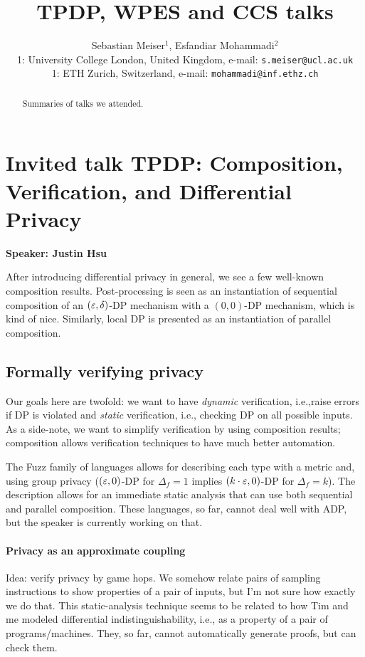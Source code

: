 \documentclass{article}
\title{TPDP, WPES and CCS talks}
\author{Sebastian Meiser$^1$, Esfandiar Mohammadi$^2$\\%
 1: University College London, United Kingdom, e-mail: \texttt{s.meiser@ucl.ac.uk}\\%
 1: ETH Zurich, Switzerland, e-mail: \texttt{mohammadi@inf.ethz.ch}\\%
}
\begin{document}
\maketitle

\begin{abstract}
Summaries of talks we attended.
\end{abstract}

\section{Invited talk TPDP: Composition, Verification, and Differential Privacy}
\noindent\textbf{Speaker: Justin Hsu}

After introducing differential privacy in general, we see a few well-known composition results.
Post-processing is seen as an instantiation of sequential composition of an $(\varepsilon,\delta)$-DP mechanism with a $(0,0)$-DP mechanism, which is kind of nice. Similarly, local DP is presented as an instantiation of parallel composition.

\subsection{Formally verifying privacy}
Our goals here are twofold: we want to have \emph{dynamic} verification, i.e.,raise errors if DP is violated and \emph{static} verification, i.e., checking DP on all possible inputs.
As a side-note, we want to simplify verification by using composition results; composition allows verification techniques to have much better automation.


The Fuzz family of languages allows for describing each type with a metric and, using group privacy ($(\varepsilon,0)$-DP for $\Delta_f = 1$ implies $(k\cdot \varepsilon,0)$-DP for $\Delta_f = k$). The description allows for an immediate static analysis that can use both sequential and parallel composition. These languages, so far, cannot deal well with ADP, but the speaker is currently working on that.

\paragraph{Privacy as an approximate coupling}
Idea: verify privacy by game hops. We somehow relate pairs of sampling instructions to show properties of a pair of inputs, but I'm not sure how exactly we do that. This static-analysis technique seems to be related to how Tim and me modeled differential indistinguishability, i.e., as a property of a pair of programs/machines. They, so far, cannot automatically generate proofs, but can check them.
\end{document}
